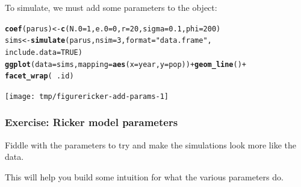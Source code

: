 \documentclass{beamer}\usepackage[]{graphicx}\usepackage[]{color}
\makeatletter
\newcommand{\hlnum}[1]{\textcolor[rgb]{0.686,0.059,0.569}{#1}}%
\newcommand{\hlstr}[1]{\textcolor[rgb]{0.192,0.494,0.8}{#1}}%
\newcommand{\hlopt}[1]{\textcolor[rgb]{0,0,0}{#1}}%
\newcommand{\hlstd}[1]{\textcolor[rgb]{0.345,0.345,0.345}{#1}}%
\newcommand{\hlkwb}[1]{\textcolor[rgb]{0.69,0.353,0.396}{#1}}%
\newcommand{\hlkwc}[1]{\textcolor[rgb]{0.333,0.667,0.333}{#1}}%
\newcommand{\hlkwd}[1]{\textcolor[rgb]{0.737,0.353,0.396}{\textbf{#1}}}%
\newenvironment{kframe}{%
 \def\at@end@of@kframe{}%
 \ifinner\ifhmode%
  \def\at@end@of@kframe{\end{minipage}}%
  \begin{minipage}{\columnwidth}%
 \fi\fi%
 \def\FrameCommand##1{\hskip\@totalleftmargin \hskip-\fboxsep
 \colorbox{shadecolor}{##1}\hskip-\fboxsep
     \hskip-\linewidth \hskip-\@totalleftmargin \hskip\columnwidth}%
 \MakeFramed {\advance\hsize-\width
   \@totalleftmargin\z@ \linewidth\hsize
   \@setminipage}}%
 {\par\unskip\endMakeFramed%
 \at@end@of@kframe}
\newenvironment{knitrout}{}{} %
\makeatother
\begin{document}
\begin{frame}[fragile]

\bi
\item To simulate, we must add some parameters to the  object:
\ei
\begin{knitrout}\small
{}\color{fgcolor}\begin{kframe}
\begin{alltt}
\hlkwd{coef}\hlstd{(parus)} \hlkwb{<-} \hlkwd{c}\hlstd{(}\hlkwc{N.0}\hlstd{=}\hlnum{1}\hlstd{,}\hlkwc{e.0}\hlstd{=}\hlnum{0}\hlstd{,}\hlkwc{r}\hlstd{=}\hlnum{20}\hlstd{,}\hlkwc{sigma}\hlstd{=}\hlnum{0.1}\hlstd{,}\hlkwc{phi}\hlstd{=}\hlnum{200}\hlstd{)}
\hlstd{sims} \hlkwb{<-} \hlkwd{simulate}\hlstd{(parus,}\hlkwc{nsim}\hlstd{=}\hlnum{3}\hlstd{,}\hlkwc{format}\hlstd{=}\hlstr{"data.frame"}\hlstd{,}
  \hlkwc{include.data}\hlstd{=}\hlnum{TRUE}\hlstd{)}
\hlkwd{ggplot}\hlstd{(}\hlkwc{data}\hlstd{=sims,}\hlkwc{mapping}\hlstd{=}\hlkwd{aes}\hlstd{(}\hlkwc{x}\hlstd{=year,}\hlkwc{y}\hlstd{=pop))}\hlopt{+}\hlkwd{geom_line}\hlstd{()}\hlopt{+}
  \hlkwd{facet_wrap}\hlstd{(}\hlopt{~}\hlstd{.id)}
\end{alltt}
\end{kframe}

{\centering \texttt{[image: tmp/figurericker-add-params-1]} 

}



\end{knitrout}

\end{frame}    

\begin{frame}[fragile] 

\frametitle{Exercise: Ricker model parameters}
\bi
\item Fiddle with the parameters to try and make the simulations look more like the data.

\item This will help you build some intuition for what the various parameters do.
\ei

\end{frame}
\end{document}

